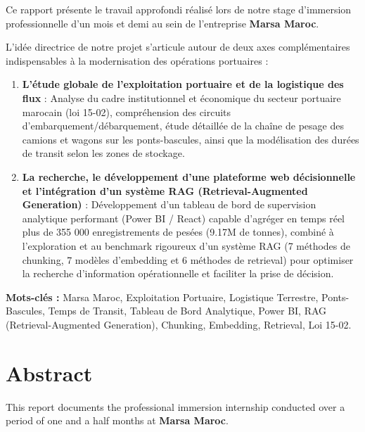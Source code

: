 \documentclass[12pt,a4paper,oneside]{report}
\begin{document}
Ce rapport présente le travail approfondi réalisé lors de notre stage d'immersion professionnelle d'un mois et demi au sein de l'entreprise \textbf{Marsa Maroc}.

L'idée directrice de notre projet s'articule autour de deux axes complémentaires indispensables à la modernisation des opérations portuaires :
\begin{enumerate}
    \item \textbf{L'étude globale de l'exploitation portuaire et de la logistique des flux} : Analyse du cadre institutionnel et économique du secteur portuaire marocain (loi 15-02), compréhension des circuits d'embarquement/débarquement, étude détaillée de la chaîne de pesage des camions et wagons sur les ponts-bascules, ainsi que la modélisation des durées de transit selon les zones de stockage.
    \item \textbf{La recherche, le développement d'une plateforme web décisionnelle et l'intégration d'un système RAG (Retrieval-Augmented Generation)} : Développement d'un tableau de bord de supervision analytique performant (Power BI / React) capable d'agréger en temps réel plus de 355 000 enregistrements de pesées (9.17M de tonnes), combiné à l'exploration et au benchmark rigoureux d'un système RAG (7 méthodes de chunking, 7 modèles d'embedding et 6 méthodes de retrieval) pour optimiser la recherche d'information opérationnelle et faciliter la prise de décision.
\end{enumerate}

\textbf{Mots-clés :} Marsa Maroc, Exploitation Portuaire, Logistique Terrestre, Ponts-Bascules, Temps de Transit, Tableau de Bord Analytique, Power BI, RAG (Retrieval-Augmented Generation), Chunking, Embedding, Retrieval, Loi 15-02.

\vspace{1cm}

\chapter*{Abstract}

This report documents the professional immersion internship conducted over a period of one and a half months at \textbf{Marsa Maroc}.
\end{document}
